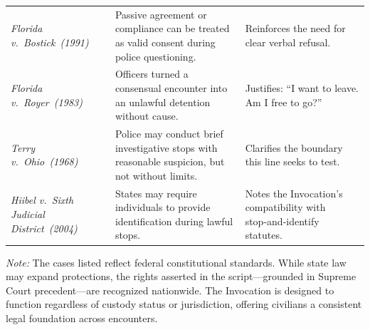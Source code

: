 \begin{longtable}{@{}P{0.22\textwidth} P{0.46\textwidth} P{0.30\textwidth}@{}}
\textit{Florida v.\ Bostick (1991)} &
Passive agreement or compliance can be treated as valid consent during police questioning. &
Reinforces the need for clear verbal refusal.\\[4pt]

\textit{Florida v.\ Royer (1983)} &
Officers turned a consensual encounter into an unlawful detention without cause. &
Justifies: “I want to leave. Am I free to go?”\\[4pt]

\textit{Terry v.\ Ohio (1968)} &
Police may conduct brief investigative stops with reasonable suspicion, but not without limits. &
Clarifies the boundary this line seeks to test.\\[4pt]

\textit{Hiibel v.\ Sixth Judicial District (2004)} &
States may require individuals to provide identification during lawful stops. &
Notes the Invocation’s compatibility with stop‑and‑identify statutes.\\
\end{longtable}

\begin{raggedright}
\emph{Note:} The cases listed reflect federal constitutional standards. While state law may expand protections, the rights asserted in the script—grounded in Supreme Court precedent—are recognized nationwide. The Invocation is designed to function regardless of custody status or jurisdiction, offering civilians a consistent legal foundation across encounters.
\end{raggedright}
